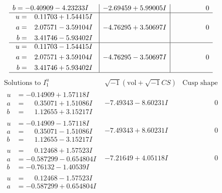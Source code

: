 \documentclass[1p]{elsarticle_modified}
\theoremstyle{definition}
\newcommand{\I}{\sqrt{-1}}
\begin{document}
$$\begin{array}{c|c|c}
\begin{aligned}
b &= -0.40909 - 4.23233 I\end{aligned}
 & -2.69459 + 5.99005 I & \phantom{-0.000000 } 0 \\ \hline\begin{aligned}
u &= \phantom{-}0.11703 + 1.54415 I \\
a &= \phantom{-}2.07571 - 3.59104 I \\
b &= \phantom{-}3.41746 - 5.93402 I\end{aligned}
 & -4.76295 + 3.50697 I & \phantom{-0.000000 } 0 \\ \hline\begin{aligned}
u &= \phantom{-}0.11703 - 1.54415 I \\
a &= \phantom{-}2.07571 + 3.59104 I \\
b &= \phantom{-}3.41746 + 5.93402 I\end{aligned}
 & -4.76295 - 3.50697 I & \phantom{-0.000000 } 0\\
 \hline 
 \end{array}$$\newpage$$\begin{array}{c|c|c}  
\text{Solutions to }I^u_{1}& \I (\text{vol} + \sqrt{-1}CS) & \text{Cusp shape}\\
 \hline 
\begin{aligned}
u &= -0.14909 + 1.57118 I \\
a &= \phantom{-}0.35071 + 1.51086 I \\
b &= \phantom{-}1.12655 + 3.15217 I\end{aligned}
 & -7.49343 - 8.60231 I & \phantom{-0.000000 } 0 \\ \hline\begin{aligned}
u &= -0.14909 - 1.57118 I \\
a &= \phantom{-}0.35071 - 1.51086 I \\
b &= \phantom{-}1.12655 - 3.15217 I\end{aligned}
 & -7.49343 + 8.60231 I & \phantom{-0.000000 } 0 \\ \hline\begin{aligned}
u &= \phantom{-}0.12468 + 1.57523 I \\
a &= -0.587299 - 0.654804 I \\
b &= -0.76132 - 1.40539 I\end{aligned}
 & -7.21649 + 4.05118 I & \phantom{-0.000000 } 0 \\ \hline\begin{aligned}
u &= \phantom{-}0.12468 - 1.57523 I \\
a &= -0.587299 + 0.654804 I \\

\end{aligned}
\end{array}$$
\end{document}
